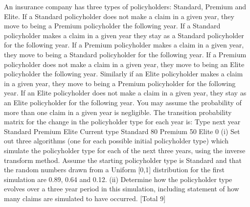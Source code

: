 \documentclass[]{report}
\begin{document}
An insurance company has three types of policyholders: Standard, Premium and Elite.
If a Standard policyholder does not make a claim in a given year, they move to being
a Premium policyholder the following year. If a Standard policyholder makes a claim
in a given year they stay as a Standard policyholder for the following year.
If a Premium policyholder makes a claim in a given year, they move to being a
Standard policyholder for the following year. If a Premium policyholder does not
make a claim in a given year, they move to being an Elite policyholder the following
year.
Similarly if an Elite policyholder makes a claim in a given year, they move to being a
Premium policyholder for the following year. If an Elite policyholder does not make
a claim in a given year, they stay as an Elite policyholder for the following year.
You may assume the probability of more than one claim in a given year is negligible.
The transition probability matrix for the change in the policyholder type for each year
is:
  Type next year
Standard Premium Elite
Current type
Standard 80%
Premium 50%
Elite 0%
(i) Set out three algorithms (one for each possible initial policyholder type) which
simulate the policyholder type for each of the next three years, using the
inverse transform method. 
Assume the starting policyholder type is Standard and that the random numbers drawn
from a Uniform [0,1] distribution for the first simulation are 0.89, 0.64 and 0.12.
(ii) Determine how the policyholder type evolves over a three year period in this
simulation, including statement of how many claims are simulated to have
occurred. 
[Total 9]
\newpage
\end{document}
